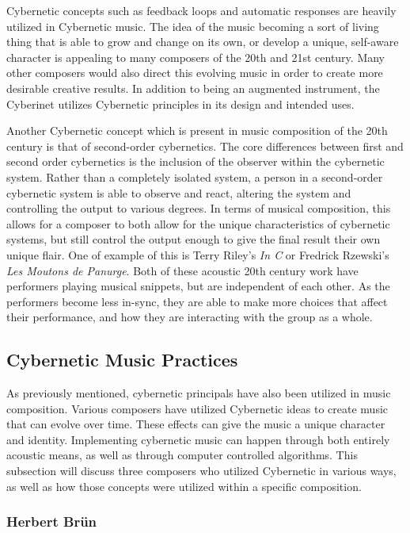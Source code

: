 Cybernetic concepts such as feedback loops and automatic responses are heavily utilized in Cybernetic music. The idea of the music becoming a sort of living thing that is able to grow and change on its own, or develop a unique, self-aware character is appealing to many composers of the 20th and 21st century. Many other composers would also direct this evolving music in order to create more desirable creative results. In addition to being an augmented instrument, the Cyberinet utilizes Cybernetic principles in its design and intended uses. 

Another Cybernetic concept which is present in music composition of the 20th century is that of second-order cybernetics. The core differences between first and second order cybernetics is the inclusion of the observer within the cybernetic system. Rather than a completely isolated system, a person in a second-order cybernetic system is able to observe and react, altering the system and controlling the output to various degrees. In terms of musical composition, this allows for a composer to both allow for the unique characteristics of cybernetic systems, but still control the output enough to give the final result their own unique flair. One of example of this is Terry Riley's \textit{In C} or Fredrick Rzewski's \textit{Les Moutons de Panurge}. Both of these acoustic 20th century work have performers playing musical snippets, but are independent of each other. As the performers become less in-sync, they are able to make more choices that affect their performance, and how they are interacting with the group as a whole.


\subsection{Cybernetic Music Practices}
As previously mentioned, cybernetic principals have also been utilized in music composition. Various composers have utilized Cybernetic ideas to create music that can evolve over time. These effects can give the music a unique character and identity. Implementing cybernetic music can happen through both entirely acoustic means, as well as through computer controlled algorithms. This subsection will discuss three composers who utilized Cybernetic in various ways, as well as how those concepts were utilized within a specific composition.


\subsubsection{Herbert Brün}

